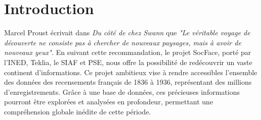 \documentclass[a4paper,12pt,twoside]{book}
\begin{document}
\chapter{Introduction}	
Marcel Proust écrivait dans \textit{Du côté de chez Swann} que \textit{"Le véritable voyage de découverte ne consiste pas à chercher de nouveaux paysages, mais à avoir de nouveaux yeux".} En suivant cette recommandation, le projet SocFace, porté par l'\gls{INED}, Teklia, le \gls{SIAF} et \gls{PSE}, nous offre la possibilité de redécouvrir un vaste continent d'informations. Ce projet ambitieux vise à rendre accessibles l'ensemble des données des recensements français de 1836 à 1936, représentant des millions d'enregistrements. Grâce à une base de données, ces précieuses informations pourront être explorées et analysées en profondeur, permettant une compréhension globale inédite de cette période.\\
\end{document}
